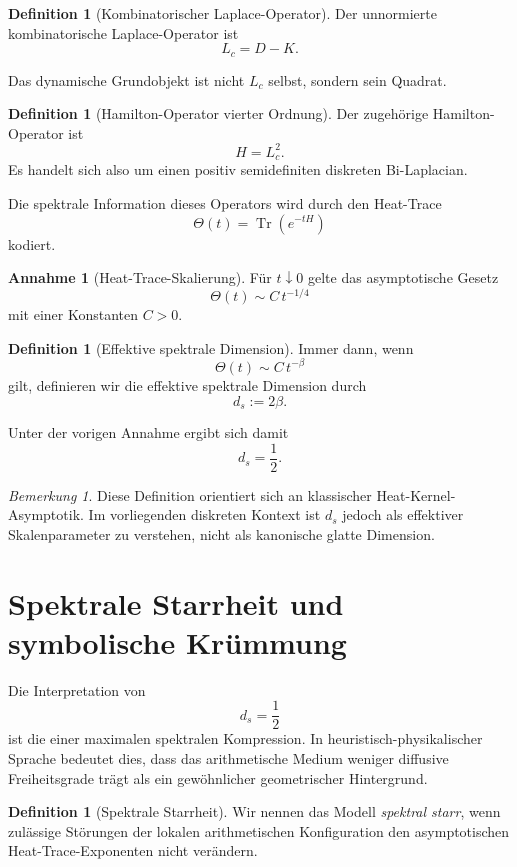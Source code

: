 \documentclass[11pt,a4paper]{amsart}
\theoremstyle{plain}
\theoremstyle{definition}
\newtheorem{definition}[satz]{Definition}
\newtheorem{annahme}[satz]{Annahme}
\theoremstyle{remark}
\newtheorem{bemerkung}[satz]{Bemerkung}
\newcommand{\Tr}{\operatorname{Tr}}
\newcommand{\ThetaH}{\Theta}
\newcommand{\Lc}{L_c}
\begin{document}
	\begin{definition}[Kombinatorischer Laplace-Operator]
		Der unnormierte kombinatorische Laplace-Operator ist
		\[
		\Lc = D-K.
		\]
	\end{definition}
	
	Das dynamische Grundobjekt ist nicht \(\Lc\) selbst, sondern sein Quadrat.
	
	\begin{definition}[Hamilton-Operator vierter Ordnung]
		Der zugehörige Hamilton-Operator ist
		\[
		H=\Lc^2.
		\]
		Es handelt sich also um einen positiv semidefiniten diskreten Bi-Laplacian.
	\end{definition}
	
	Die spektrale Information dieses Operators wird durch den Heat-Trace
	\[
	\ThetaH(t)=\Tr(e^{-tH})
	\]
	kodiert.
	
	\begin{annahme}[Heat-Trace-Skalierung]
		Für \(t\downarrow 0\) gelte das asymptotische Gesetz
		\[
		\ThetaH(t)\sim C\,t^{-1/4}
		\]
		mit einer Konstanten \(C>0\).
	\end{annahme}
	
	\begin{definition}[Effektive spektrale Dimension]
		Immer dann, wenn
		\[
		\ThetaH(t)\sim C\,t^{-\beta}
		\]
		gilt, definieren wir die effektive spektrale Dimension durch
		\[
		d_s:=2\beta.
		\]
	\end{definition}
	
	Unter der vorigen Annahme ergibt sich damit
	\[
	d_s=\frac12.
	\]
	
	\begin{bemerkung}
		Diese Definition orientiert sich an klassischer Heat-Kernel-Asymptotik. Im vorliegenden diskreten Kontext ist \(d_s\) jedoch als effektiver Skalenparameter zu verstehen, nicht als kanonische glatte Dimension.
	\end{bemerkung}
	
	\section{Spektrale Starrheit und symbolische Krümmung}
	
	Die Interpretation von
	\[
	d_s=\frac12
	\]
	ist die einer maximalen spektralen Kompression. In heuristisch-physikalischer Sprache bedeutet dies, dass das arithmetische Medium weniger diffusive Freiheitsgrade trägt als ein gewöhnlicher geometrischer Hintergrund.
	
	\begin{definition}[Spektrale Starrheit]
		Wir nennen das Modell \emph{spektral starr}, wenn zulässige Störungen der lokalen arithmetischen Konfiguration den asymptotischen Heat-Trace-Exponenten nicht verändern.
	\end{definition}
	
\end{document}
